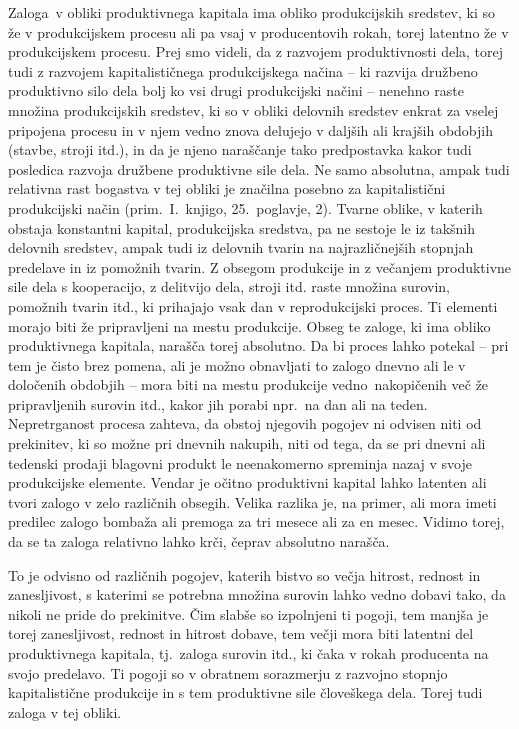 \documentclass[kapital_02.tex]{subfiles}
\begin{document}
Zaloga\KPEstran\ v obliki produktivnega kapitala ima obliko produkcijskih sredstev, ki so že v produkcijskem procesu ali pa vsaj v producentovih rokah, torej latentno že v produkcijskem procesu.
Prej smo videli, da z razvojem produktivnosti dela, torej tudi z razvojem kapitalističnega produkcijskega načina -- ki razvija družbeno produktivno silo dela bolj ko vsi drugi produkcijski načini -- nenehno raste množina produkcijskih sredstev, ki so v obliki delovnih sredstev enkrat za vselej pripojena procesu in v njem vedno znova delujejo v daljših ali krajših obdobjih (stavbe, stroji itd.), in da je njeno naraščanje tako predpostavka kakor tudi posledica razvoja družbene produktivne sile dela.
Ne samo absolutna, ampak tudi relativna rast bogastva v tej obliki je značilna posebno za kapitalistični produkcijski način (prim.\ I.\ knjigo, 25.\ poglavje, 2).
Tvarne oblike, v katerih obstaja konstantni kapital, produkcijska sredstva, pa ne sestoje le iz takšnih delovnih sredstev, ampak tudi iz delovnih tvarin na najrazličnejših stopnjah predelave in iz pomožnih tvarin.
Z obsegom produkcije in z večanjem produktivne sile dela s kooperacijo, z delitvijo dela, stroji itd. raste množina surovin, pomožnih tvarin itd., ki prihajajo vsak dan v reprodukcijski proces.
Ti elementi morajo biti že pripravljeni na mestu produkcije. Obseg te zaloge, ki ima obliko produktivnega kapitala, narašča torej absolutno.
Da bi proces lahko potekal -- pri tem je čisto brez pomena, ali je možno obnavljati to zalogo dnevno ali le v določenih obdobjih -- mora biti na mestu produkcije vedno\KPEstran\ nakopičenih več že pripravljenih surovin itd., kakor jih porabi npr.\ na dan ali na teden.
Nepretrganost procesa zahteva, da obstoj njegovih pogojev ni odvisen niti od prekinitev, ki so možne pri dnevnih nakupih, niti od tega, da se pri dnevni ali tedenski prodaji blagovni produkt le neenakomerno spreminja nazaj v svoje produkcijske elemente.
Vendar je očitno produktivni kapital lahko latenten ali tvori zalogo v zelo različnih obsegih.
Velika razlika je, na primer, ali mora imeti predilec zalogo bombaža ali premoga za tri mesece ali za en mesec.
Vidimo torej, da se ta zaloga relativno lahko krči, čeprav absolutno narašča.

To je odvisno od različnih pogojev, katerih bistvo so večja hitrost, rednost in zanesljivost, s katerimi se potrebna množina surovin lahko vedno dobavi tako, da nikoli ne pride do prekinitve.
Čim slabše so izpolnjeni ti pogoji, tem manjša je torej zanesljivost, rednost in hitrost dobave, tem večji mora biti latentni del produktivnega kapitala, tj.\ zaloga surovin itd., ki čaka v rokah producenta na svojo predelavo.
Ti pogoji so v obratnem sorazmerju z razvojno stopnjo kapitalistične produkcije in s tem produktivne sile človeškega dela.
Torej tudi zaloga v tej obliki.
\end{document}
